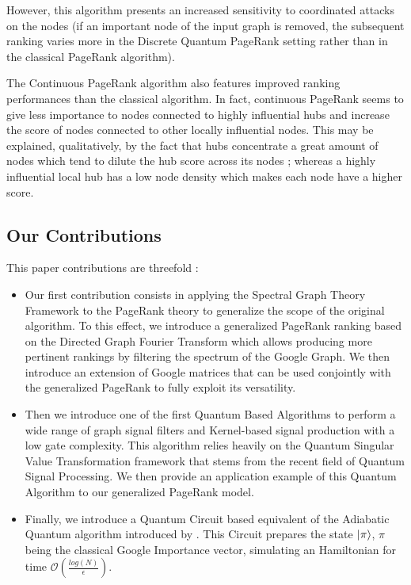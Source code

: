 \documentclass{article}
\begin{document}
However, this algorithm presents an increased sensitivity to coordinated attacks on the nodes (if an important node of the input graph is removed, the subsequent ranking varies more in the Discrete Quantum PageRank setting rather than in the classical PageRank algorithm).

The Continuous PageRank algorithm \cite{sánchez-burillo_duch_gómez-gardeñes_zueco_2012} also features improved ranking performances than the classical algorithm. In fact, continuous PageRank seems to give less importance to nodes connected to highly influential hubs and increase the score of nodes connected to other locally influential nodes. This may be explained, qualitatively, by the fact that hubs concentrate a great amount of nodes which tend to dilute the hub score across its nodes ; whereas a highly influential local hub has a low node density which makes each node have a higher score.

\subsection{Our Contributions}
This paper contributions are threefold :

\begin{itemize}
    \item Our first contribution consists in applying the Spectral Graph Theory Framework to the PageRank theory to generalize the scope of the original algorithm. To this effect, we introduce a generalized PageRank ranking based on the Directed Graph Fourier Transform which allows producing more pertinent rankings by filtering the spectrum of the Google Graph. We then introduce an extension of Google matrices that can be used conjointly with the generalized PageRank to fully exploit its versatility.
    
    \item Then we introduce one of the first Quantum Based Algorithms to perform a wide range of graph signal filters and Kernel-based signal production with a low gate complexity. This algorithm relies heavily on the Quantum Singular Value Transformation framework that stems from the recent field of Quantum Signal Processing. We then provide an application example of this Quantum Algorithm to our generalized PageRank model.
    
    \item Finally, we introduce a Quantum Circuit based equivalent of the Adiabatic Quantum algorithm introduced by \cite{garnerone_zanardi_lidar_2012}. This Circuit prepares the state $\ket{\pi}$, $\pi$ being the classical Google Importance vector, simulating an Hamiltonian for time $\mathcal{O}(\frac{log(N)}{\epsilon})$. 
    
\end{itemize}
\end{document}
